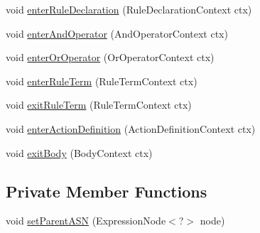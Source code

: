 \begin{DoxyCompactItemize}
void \hyperlink{classit_1_1emarolab_1_1cagg_1_1core_1_1language_1_1parser_1_1ParserListener_a23734ed11648eae22a037a43e8c2d007}{enter\-Rule\-Declaration} (Rule\-Declaration\-Context ctx)
\item 
void \hyperlink{classit_1_1emarolab_1_1cagg_1_1core_1_1language_1_1parser_1_1ParserListener_a27394515e7347376dc937974202abbc9}{enter\-And\-Operator} (And\-Operator\-Context ctx)
\item 
void \hyperlink{classit_1_1emarolab_1_1cagg_1_1core_1_1language_1_1parser_1_1ParserListener_a0c20b78d0166b7fe8cf816764d9c7c86}{enter\-Or\-Operator} (Or\-Operator\-Context ctx)
\item 
void \hyperlink{classit_1_1emarolab_1_1cagg_1_1core_1_1language_1_1parser_1_1ParserListener_ab55244dd0bc74c42338389ef4f186963}{enter\-Rule\-Term} (Rule\-Term\-Context ctx)
\item 
void \hyperlink{classit_1_1emarolab_1_1cagg_1_1core_1_1language_1_1parser_1_1ParserListener_a9cddde49b7fd2142b1fcd72b5d6e2c51}{exit\-Rule\-Term} (Rule\-Term\-Context ctx)
\item 
void \hyperlink{classit_1_1emarolab_1_1cagg_1_1core_1_1language_1_1parser_1_1ParserListener_a95c6463441d582fef5d63aea4eb13f56}{enter\-Action\-Definition} (Action\-Definition\-Context ctx)
\item 
void \hyperlink{classit_1_1emarolab_1_1cagg_1_1core_1_1language_1_1parser_1_1ParserListener_a4ddc07fbccb866fee058db32839fba42}{exit\-Body} (Body\-Context ctx)
\end{DoxyCompactItemize}
\subsection*{Private Member Functions}
\begin{DoxyCompactItemize}
\item 
void \hyperlink{classit_1_1emarolab_1_1cagg_1_1core_1_1language_1_1parser_1_1ParserListener_a56e1bb81f0f206ed8893b8f9a41bf6d5}{set\-Parent\-A\-S\-N} (Expression\-Node$<$?$>$ node)
\end{DoxyCompactItemize}
